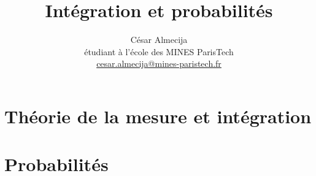 \documentclass[french]{report}
\theoremstyle{plain}
\theoremstyle{definition}
\theoremstyle{remark}
\begin{document}
\title{Intégration et probabilités}

\author{César Almecija
\\ étudiant à l'école des MINES ParisTech
\\ \href{mailto:cesar.almecija@mines-paristech.fr}{cesar.almecija@mines-paristech.fr}}

\maketitle

\tableofcontents



\part{Théorie de la mesure et intégration}









\part{Probabilités}






\end{document}
